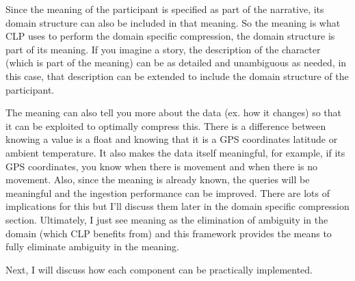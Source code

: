 Since the meaning of the participant is specified as part of the narrative, its domain structure can also be included in that meaning. So the meaning is what CLP uses to perform the domain specific compression, the domain structure is part of its meaning. If you imagine a story, the description of the character (which is part of the meaning) can be as detailed and unambiguous as needed, in this case, that description can be extended to include the domain structure of the participant. 

The meaning can also tell you more about the data (ex. how it changes) so that it can be exploited to optimally compress this. There is a difference between knowing a value is a float and knowing that it is a GPS coordinates latitude or ambient temperature. It also makes the data itself meaningful, for example, if its GPS coordinates, you know when there is movement and when there is no movement. Also, since the meaning is already known, the queries will be meaningful and the ingestion performance can be improved. There are lots of implications for this but I'll discuss them later in the domain specific compression section. Ultimately, I just see meaning as the elimination of ambiguity in the domain (which CLP benefits from) and this framework provides the means to fully eliminate ambiguity in the meaning.

Next, I will discuss how each component can be practically implemented.


